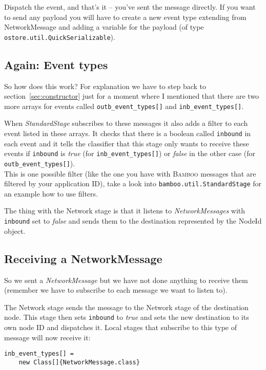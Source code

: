 \documentclass[twocolumn, twoside, a4paper]{article}
\begin{document}
Dispatch the event, and that's it -- you've sent the message
directly. If you want to send any payload you will have to create
a new event type extending from NetworkMessage and adding a variable for
the payload (of type \texttt{ostore.util.QuickSerializable}).


\subsection{Again: Event types}
\label{sec:networkmessage:sec:eventtypes}

So how does this work? For explanation we have to step back to
section~\ref{sec:constructor} just for a moment where I mentioned that
there are two more arrays for events called \texttt{outb\_event\_types[]}
and \texttt{inb\_event\_types[]}.  

When \emph{StandardStage} subscribes to these messages it also adds a filter to
each event listed in these arrays. It checks that there is a boolean
called \texttt{inbound} in each event and it tells the classifier that this stage
only wants to receive these events if \texttt{inbound} is \emph{true} (for
\texttt{inb\_event\_types[]}) or \emph{false} in the other case (for
\texttt{outb\_event\_types[]}).\\
This is one possible filter (like the one you have with \textsc{Bamboo} messages
that are filtered by your application ID), take a look into
\texttt{bamboo.util.StandardStage} for an example how to use filters.

The thing with the Network stage is that it listens to \emph{NetworkMessages}
with \texttt{inbound} set to \emph{false} and sends them to the destination
represented by the NodeId object.


\subsection{Receiving a NetworkMessage}
\label{sec:networkmessage:sec:receiving}

So we sent a \emph{NetworkMessage} but we have not done anything to receive
them (remember we have to subscribe to each message we want to listen
to).

The Network stage sends the message to the Network stage of the
destination node. This stage then sets \texttt{inbound} to \emph{true} and sets
the new destination to its own node ID and dispatches it. Local stages
that subscribe to this type of message will now receive it:
\lstset{language=Java, aboveskip=10pt, belowskip=10pt, numbers=none}
\begin{lstlisting}
inb_event_types[] = 
    new Class[]{NetworkMessage.class}
\end{lstlisting}
\end{document}
